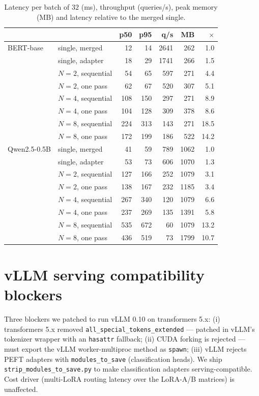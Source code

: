 \documentclass[11pt]{article}
\begin{document}
\begin{table}[h]
\centering\small
\setlength{\tabcolsep}{2.5pt}
\caption{Latency per batch of $32$ (ms), throughput (queries/s), peak memory (MB) and latency relative to the merged single.}
\label{tab:latency}
\begin{tabular}{@{}llrrrrr@{}}
\toprule
 & & p50 & p95 & q/s & MB & $\times$ \\
\midrule
BERT-base & single, merged & 12 & 14 & 2641 & 262 & 1.0 \\
 & single, adapter & 18 & 29 & 1741 & 266 & 1.5 \\
 & $N{=}2$, sequential & 54 & 65 & 597 & 271 & 4.4 \\
 & $N{=}2$, one pass & 62 & 67 & 520 & 307 & 5.1 \\
 & $N{=}4$, sequential & 108 & 150 & 297 & 271 & 8.9 \\
 & $N{=}4$, one pass & 104 & 128 & 309 & 378 & 8.6 \\
 & $N{=}8$, sequential & 224 & 313 & 143 & 271 & 18.5 \\
 & $N{=}8$, one pass & 172 & 199 & 186 & 522 & 14.2 \\
\midrule
Qwen2.5-0.5B & single, merged & 41 & 59 & 789 & 1062 & 1.0 \\
 & single, adapter & 53 & 73 & 606 & 1070 & 1.3 \\
 & $N{=}2$, sequential & 127 & 166 & 252 & 1079 & 3.1 \\
 & $N{=}2$, one pass & 138 & 167 & 232 & 1185 & 3.4 \\
 & $N{=}4$, sequential & 267 & 340 & 120 & 1079 & 6.6 \\
 & $N{=}4$, one pass & 237 & 269 & 135 & 1391 & 5.8 \\
 & $N{=}8$, sequential & 535 & 672 & 60 & 1079 & 13.2 \\
 & $N{=}8$, one pass & 436 & 519 & 73 & 1799 & 10.7 \\
\bottomrule
\end{tabular}
\end{table}

\section{vLLM serving compatibility blockers}\label{app:vllm}
{\sloppy Three blockers we patched to run vLLM 0.10 on transformers 5.x: (i) transformers 5.x removed \texttt{all\_\allowbreak special\_\allowbreak tokens\_\allowbreak extended} --- patched in vLLM's tokenizer wrapper with an \texttt{hasattr} fallback; (ii) CUDA forking is rejected --- must export the vLLM worker-multiproc method as \texttt{spawn}; (iii) vLLM rejects PEFT adapters with \texttt{modules\_to\_save} (classification heads). We ship \texttt{strip\_\allowbreak modules\_\allowbreak to\_\allowbreak save.\allowbreak py} to make classification adapters serving-compatible. Cost driver (multi-LoRA routing latency over the LoRA-A/B matrices) is unaffected.\par}
\end{document}
